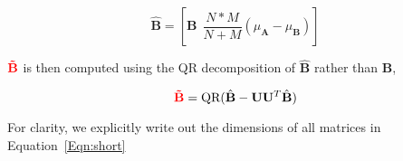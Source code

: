 \begin{equation}
\hat{\mathbf{B}}=\left[\mathbf{B} \ \ \frac{N*M}{N+M}(\mu_\mathbf{A}-\mu_\mathbf{B})\right]
\end{equation}

${\color{red}\mathbf{\tilde{B}}}$ is then computed using the QR decomposition of $\hat{\mathbf{B}}$ rather than $\mathbf{B}$,

\begin{equation}
{\color{red}\mathbf{\tilde{B}}}=\textrm{QR}(\hat{\mathbf{B}} - \mathbf{U}\mathbf{U}^T\hat{\mathbf{B}})
\end{equation}



For clarity, we explicitly write out the dimensions of all matrices in Equation~\ref{Eqn:short}

